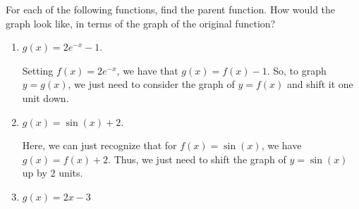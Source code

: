 \documentclass{ximera}
\begin{document}
\begin{example}
  For each of the following functions, find the parent function. How would the graph look like, in terms of the graph of the original function?
  \begin{enumerate}[label=\alph*.]
  \item $g(x) = 2e^{-x} - 1$. \\[.5em]
    \begin{explanation}
      Setting $f(x) = 2e^{-x}$, we have that $g(x) = f(x)-1$. So, to graph $y=g(x)$, we just need to consider the graph of $y=f(x)$ and shift it one unit down.
      \begin{image}
      \end{image}
    \end{explanation}
  \item $g(x) = \sin(x) + 2$. \\[.5em]
    \begin{explanation}
      Here, we can just recognize that for $f(x) = \sin(x)$, we have $g(x) = f(x)+2$. Thus, we just need to shift the graph of $y=\sin(x)$ up by $2$ units.
      \begin{image}
      \end{image}
    \end{explanation}
  \item $g(x) = 2x-3$ \\[.5em]
    \begin{explanation}

\end{explanation}
\end{enumerate}
\end{example}
\end{document}

